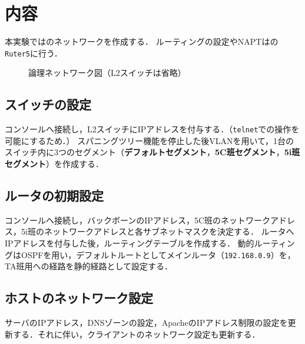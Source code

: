 \section{内容}
本実験ではのネットワークを作成する．
ルーティングの設定やNAPTはの\texttt{Ruter5}に行う．
\begin{figure}
    \centering
    
    \caption{論理ネットワーク図（L2スイッチは省略）}
    \label{fig:ネットワーク図}
\end{figure}
\subsection{スイッチの設定}
コンソールへ接続し，L2スイッチにIPアドレスを付与する．（\texttt{telnet}での操作を可能にするため．）
スパニングツリー機能を停止した後VLANを用いて，1台のスイッチ内に3つのセグメント（\textbf{デフォルトセグメント}，\textbf{5C班セグメント}，\textbf{5i班セグメント}）を作成する．
\subsection{ルータの初期設定}
コンソールへ接続し，バックボーンのIPアドレス，5C班のネットワークアドレス，5i班のネットワークアドレスと各サブネットマスクを決定する．
ルータへIPアドレスを付与した後，ルーティングテーブルを作成する．
動的ルーティングはOSPFを用い，デフォルトルートとしてメインルータ（\texttt{192.168.0.9}）を，TA班用への経路を静的経路として設定する．
\subsection{ホストのネットワーク設定}
サーバのIPアドレス，DNSゾーンの設定，ApacheのIPアドレス制限の設定を更新する．それに伴い，クライアントのネットワーク設定も更新する．
